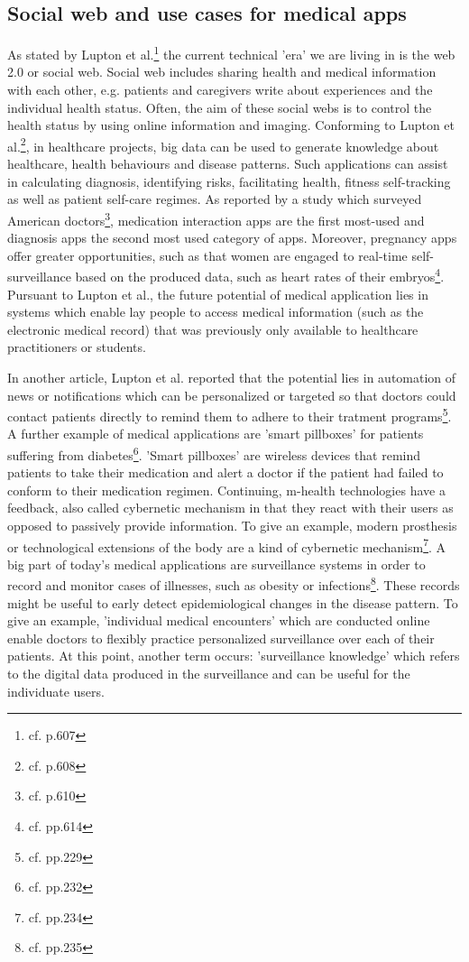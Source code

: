 \subsection{Social web and use cases for medical apps}
As stated by Lupton et al.\footnote{cf.\autocite{lupton_apps} p.607} the current technical 'era' we are living in is the web 2.0 or social web. Social web includes sharing health and medical information with each other, e.g. patients and caregivers write about experiences and the individual health status. Often, the aim of these social webs is to control the health status by using online information and imaging.
Conforming to Lupton et al.\footnote{cf.\autocite{lupton_apps} p.608}, in healthcare projects, big data can be used to generate knowledge about healthcare, health behaviours and disease patterns. Such applications can assist in calculating diagnosis, identifying risks, facilitating health, fitness self-tracking as well as patient self-care regimes.
As reported by a study which surveyed American doctors\footnote{cf.\autocite{lupton_apps} p.610}, medication interaction apps are the first most-used and diagnosis apps the second most used category of apps.
Moreover, pregnancy apps offer greater opportunities, such as that women are engaged to real-time self-surveillance based on the produced data, such as heart rates of their embryos\footnote{cf.\autocite{lupton_apps} pp.614}. Pursuant to Lupton et al., the future potential of medical application lies in systems which enable lay people to access medical information (such as the electronic medical record) that was previously only available to healthcare practitioners or students.

In another article, Lupton et al. reported that the potential lies in automation of news or notifications which can be personalized or targeted so that doctors could contact patients directly to remind them to adhere to their tratment programs\footnote{cf.\autocite{lupton_mhealth} pp.229}.
A further example of medical applications are 'smart pillboxes' for patients suffering from diabetes\footnote{cf.\autocite{lupton_mhealth} pp.232}. 'Smart pillboxes' are wireless devices that remind patients to take their medication and alert a doctor if the patient had failed to conform to their medication regimen.
Continuing, \ac{m-health} technologies have a feedback, also called cybernetic mechanism in that they react with their users as opposed to passively provide information. To give an example, modern prosthesis or technological extensions of the body are a kind of cybernetic mechanism\footnote{cf.\autocite{lupton_mhealth} pp.234}. 
A big part of today's medical applications are surveillance systems in order to record and monitor cases of illnesses, such as obesity or infections\footnote{cf.\autocite{lupton_mhealth} pp.235}. These records might be useful to early detect epidemiological changes in the disease pattern. To give an example, 'individual medical encounters' which are conducted online enable doctors to flexibly practice personalized surveillance over each of their patients. At this point, another term occurs: 'surveillance knowledge' which refers to the digital data produced in the surveillance and can be useful for the individuate users.

